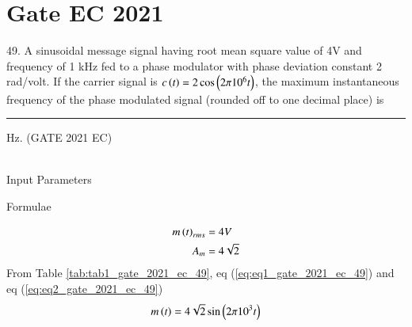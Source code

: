 \documentclass[journal,12pt,twocolumn]{IEEEtran}
\begin{document}


\vspace{3cm}

\title{}
\author{EE23BTECH11054 -  Sai Krishna Shanigarapu$^{*}$
}
\maketitle
\newpage
\bigskip

\section*{Gate EC 2021}
49. \hspace{2pt} A sinusoidal message signal having root mean square value of 4V and frequency of 1 kHz fed to a phase modulator with phase deviation constant 2 rad/volt. If the carrier signal is $c\left(t\right) = 2\cos \left(2\pi 10^6 t\right)$, the maximum instantaneous frequency of the phase modulated signal (rounded off to one decimal place) is \rule{1cm}{0.05mm} Hz. \hfill(GATE 2021 EC)\\
\solution\\

\begin{table}[ht]
    \centering
    \begin{adjustbox}{width=\columnwidth}
    
    \end{adjustbox}
    \caption{Input Parameters}
    \label{tab:tab1_gate_2021_ec_49}
\end{table}

\begin{table}[ht]
    \centering
    \begin{adjustbox}{width=\columnwidth}
    
    \end{adjustbox}
    \caption{Formulae}
    \label{tab:tab2_gate_2021_ec_49}
\end{table}

\begin{align}
    m\left(t\right)_{rms} &= 4V \label{eq:eq1_gate_2021_ec_49} \\
    A_m &= 4\sqrt{2} \label{eq:eq2_gate_2021_ec_49}
\end{align}
From Table \ref{tab:tab1_gate_2021_ec_49}, eq (\ref{eq:eq1_gate_2021_ec_49}) and eq (\ref{eq:eq2_gate_2021_ec_49})
\begin{align}
     m\left(t\right) &= 4\sqrt{2}\sin \left(2 \pi 10^3 t\right)\\
\end{align}
\end{document}
